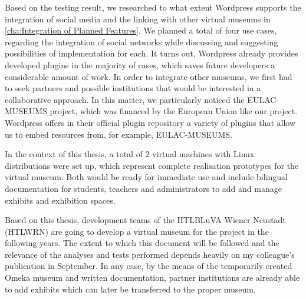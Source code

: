 Based on the testing result, we researched to what extent Wordpress supports the integration of social media and the linking with other virtual museums in \ref{cha:Integration of Planned Features}. We planned a total of four use cases, regarding the integration of social networks while discussing and suggesting possibilities of implementation for each. It turns out, Wordpress already provides developed plugins in the majority of cases, which saves future developers a considerable amount of work. In order to integrate other museums, we first had to seek partners and possible institutions that would be interested in a collaborative approach. In this matter, we particularly noticed the EULAC-MUSEUMS project, which was financed by the European Union like our project. Wordpress offers in their official plugin repository a variety of plugins that allow us to embed resources from, for example, EULAC-MUSEUMS.

In the context of this thesis, a total of 2 virtual machines with Linux distributions were set up, which represent complete realisation prototypes for the virtual museum. Both would be ready for immediate use and include bilingual documentation for students, teachers and administrators to add and manage exhibits and exhibition spaces.

Based on this thesis, development teams of the HTLBLuVA Wiener Neustadt (HTLWRN) are going to develop a virtual museum for the project in the following years. The extent to which this document will be followed and the relevance of the analyses and tests performed depends heavily on my colleague's publication in September. In any case, by the means of the temporarily created Omeka museum and written documentation, partner institutions are already able to add exhibits which can later be transferred to the proper museum.
